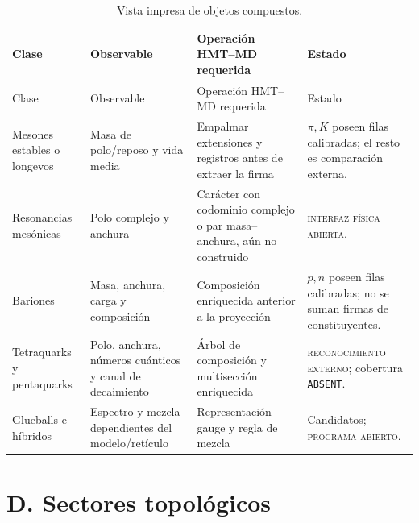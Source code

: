 \begin{longtable}{@{}L{0.20\textwidth}L{0.22\textwidth}L{0.24\textwidth}L{0.25\textwidth}@{}}
\caption{Vista impresa de objetos compuestos.}
\label{tab:catalogo-compuestos}\\
\toprule
Clase & Observable & Operación HMT--MD requerida & Estado\\
\midrule
\endfirsthead
\toprule
Clase & Observable & Operación HMT--MD requerida & Estado\\
\midrule
\endhead
Mesones estables o longevos&
Masa de polo/reposo y vida media&
Empalmar extensiones y registros antes de extraer la firma&
\(\pi,K\) poseen filas calibradas; el resto es comparación externa.\\
Resonancias mesónicas&
Polo complejo y anchura&
Carácter con codominio complejo o par masa--anchura, aún no construido&
\textsc{interfaz física abierta}.\\
Bariones&
Masa, anchura, carga y composición&
Composición enriquecida anterior a la proyección&
\(p,n\) poseen filas calibradas; no se suman firmas de constituyentes.\\
Tetraquarks y pentaquarks&
Polo, anchura, números cuánticos y canal de decaimiento&
Árbol de composición y multisección enriquecida&
\textsc{reconocimiento externo}; cobertura \texttt{ABSENT}.\\
Glueballs e híbridos&
Espectro y mezcla dependientes del modelo/retículo&
Representación gauge y regla de mezcla&
Candidatos; \textsc{programa abierto}.\\
\bottomrule
\end{longtable}

\section{D. Sectores topológicos}

